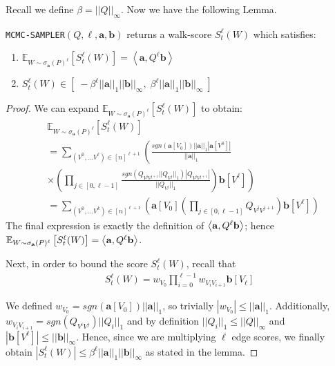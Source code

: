 
Recall we define $\beta = ||Q||_{\infty}$. 
Now we have the following Lemma.
\begin{lemma}
\label{lem:mcmc}	
\texttt{MCMC-SAMPLER}$(Q, {\ell},\mathbf{a},\mathbf{b})$ returns a walk-score $S_{t}^{\ell}(W)$ which satisfies:
\begin{enumerate}
\item $\mathbb{E}_{W \sim \sigma_{\mathbf{a}}(P)^{\ell}} \left[S_{t}^{\ell}(W)\right] = \left<\mathbf{a}, Q^{\ell}\mathbf{b} \right>$
\item $S_{t}^{\ell}(W) \in [\;-\beta^{\ell}||\mathbf{a}||_1||\mathbf{b}||_{\infty} ,\; \beta^{\ell}||\mathbf{a}||_1||\mathbf{b}||_{\infty} \;]$
\end{enumerate}
\end{lemma}


\begin{proof}
We can expand $\mathbb{E}_{W \sim \sigma_{\mathbf{a}}(P)^{\ell}} \left[S_{t}^{\ell}(W)\right]$ to obtain:
\small
\begin{align*}
&\mathbb{E}_{W \sim \sigma_{\mathbf{a}}(P)^{\ell}} \left[S_{t}^{\ell}(W)\right] \\ 
&= \sum_{(V^0, ... V^{\ell}) \in [n]^{\ell+1}} \left(\frac{sgn(\mathbf{a}[V_0])||\mathbf{a}||_1|\mathbf{a}[V^0]|}{||\mathbf{a}||_1} \right. \\
&\left. \times \left( \prod_{j \in [0, \ell-1]} \frac{sgn(Q_{V^jV^{j+1}}||Q_{V^j}||_1)|Q_{V^jV^{j+1}}|}{||Q_{V^j}||_1} \right) \mathbf{b}[V^{\ell}] \right) \\
& = \sum_{(V^0, ... V^{k}) \in [n]^{\ell+1}} \left(\mathbf{a}[V_0] \left( \prod_{j \in [0,\ell-1]} Q_{V^jV^{j+1}}\right) \mathbf{b}[V^{\ell}] \right)
\end{align*}
\normalsize
The final expression is exactly the definition of $\left< \mathbf{a}, Q^{\ell}\mathbf{b} \right>$; hence $\mathbb{E}_{W \sim \sigma_{\mathbf{a}}(P)^{\ell}} \left[S_{t}^{\ell}(W)\right] = \left< \mathbf{a}, Q^{\ell}\mathbf{b} \right>$.


Next, in order to bound the score $S_{t}^{\ell}(W)$, recall that
\begin{align*}
S_{t}^{\ell}(W) = w_{V_0}\prod_{i=0}^{\ell-1}w_{V_iV_{i+1}}\mathbf{b}[V_{\ell}]
\end{align*}

We defined $w_{V_0} = sgn(\mathbf{a}[V_0])||\mathbf{a}||_1$, so trivially $|w_{V_0}| \leq ||\mathbf{a}||_1$.
Additionally, $w_{V_iV_{i+1}} = sgn(Q_{V^iV^j})||Q_i||_1 $ and by definition $||Q_i||_1  \leq ||Q||_{\infty}$ and $| \mathbf{b}[V^{\ell}] |\leq ||\mathbf{b}||_\infty$.
Hence, since we are multiplying ${\ell}$ edge scores, we finally obtain
$|S_{t}^{\ell}(W)| \leq \beta^{\ell}||\mathbf{a}||_1||\mathbf{b}||_\infty$ as stated in the lemma.
\end{proof}

